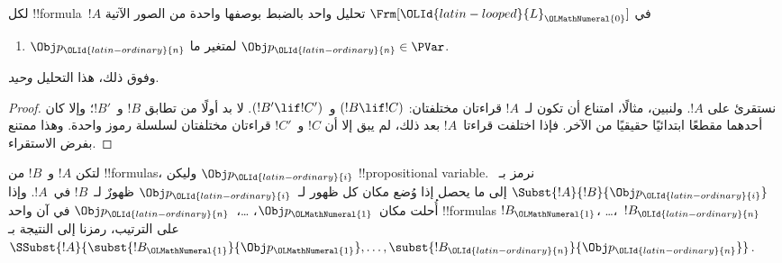 \documentclass[../../../include/open-logic-section]{subfiles}
\begin{document}
\begin{prop}
لكل !!{formula}~$!A$ في $ \Frm[\OLId{latin-looped}{L}_\OLMathNumeral{0}]$ تحليل واحد بالضبط بوصفها واحدة من
الصور الآتية
\begin{enumerate}


\item $\Obj p_\OLId{latin-ordinary}{n}$ لمتغير ما $\Obj p_\OLId{latin-ordinary}{n} \in  \PVar$.





\end{enumerate}
وفوق ذلك، هذا التحليل \emph{وحيد}.
\end{prop}

\begin{proof}
نستقرئ على $!A$. ولنبين، مثالًا، امتناع أن تكون لـ~$!A$ قراءتان مختلفتان:
$(!B \lif !C)$ و~$(!B' \lif !C')$. لا بد أولًا من تطابق $!B$ و~$!B'$؛ وإلا كان أحدهما مقطعًا ابتدائيًا حقيقيًا من الآخر. فإذا اختلفت قراءتا~$!A$ بعد ذلك، لم يبق إلا أن $!C$ و~$!C'$ قراءتان مختلفتان لسلسلة رموز واحدة. وهذا ممتنع بفرض الاستقراء.
\end{proof}

\begin{defn}
لتكن $!A$ و~$!B$ من !!{formula}s، وليكن $\Obj p_\OLId{latin-ordinary}{i}$ !!{propositional
variable}. نرمز بـ~$\Subst{!A}{!B}{\Obj p_\OLId{latin-ordinary}{i}}$ إلى ما يحصل إذا وُضع مكان كل ظهور لـ~$\Obj p_\OLId{latin-ordinary}{i}$ ظهورٌ لـ~$!B$ في~$!A$.
وإذا أُحلت مكان~$\Obj p_\OLMathNumeral{1}$، \dots،~$\Obj p_\OLId{latin-ordinary}{n}$ في آن واحد
!!{formula}s $!B_\OLMathNumeral{1}$، \dots،~$!B_\OLId{latin-ordinary}{n}$ على الترتيب، رمزنا إلى النتيجة بـ
$\SSubst{!A}{\subst{!B_\OLMathNumeral{1}}{\Obj p_\OLMathNumeral{1}},\dots,\subst{!B_\OLId{latin-ordinary}{n}}{\Obj p_\OLId{latin-ordinary}{n}}}$.
\end{defn}
\end{document}
